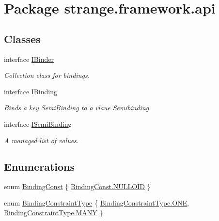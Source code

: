 \hypertarget{namespacestrange_1_1framework_1_1api}{\section{Package strange.\-framework.\-api}
\label{namespacestrange_1_1framework_1_1api}
}
\subsection*{Classes}
\begin{DoxyCompactItemize}
\item 
interface \hyperlink{interfacestrange_1_1framework_1_1api_1_1_i_binder}{I\-Binder}
\begin{DoxyCompactList}\small\item\em Collection class for bindings. \end{DoxyCompactList}\item 
interface \hyperlink{interfacestrange_1_1framework_1_1api_1_1_i_binding}{I\-Binding}
\begin{DoxyCompactList}\small\item\em Binds a key Semi\-Binding to a vlaue Semibinding. \end{DoxyCompactList}\item 
interface \hyperlink{interfacestrange_1_1framework_1_1api_1_1_i_semi_binding}{I\-Semi\-Binding}
\begin{DoxyCompactList}\small\item\em A managed list of values. \end{DoxyCompactList}\end{DoxyCompactItemize}
\subsection*{Enumerations}
\begin{DoxyCompactItemize}
\item 
enum \hyperlink{namespacestrange_1_1framework_1_1api_adcc058ca6ff0fe013ffdbf63ada74a97}{Binding\-Const} \{ \hyperlink{namespacestrange_1_1framework_1_1api_adcc058ca6ff0fe013ffdbf63ada74a97a5f32587ea07e2a7ad41b7461e159da30}{Binding\-Const.\-N\-U\-L\-L\-O\-I\-D}
 \}
\item 
enum \hyperlink{namespacestrange_1_1framework_1_1api_a9819c5ab6d03a2cbce2d3dddf5264e42}{Binding\-Constraint\-Type} \{ \hyperlink{namespacestrange_1_1framework_1_1api_a9819c5ab6d03a2cbce2d3dddf5264e42abc21e6484530fc9d0313cb816b733396}{Binding\-Constraint\-Type.\-O\-N\-E}, 
\hyperlink{namespacestrange_1_1framework_1_1api_a9819c5ab6d03a2cbce2d3dddf5264e42a914afc10e7ea496e240a80be1bc01d09}{Binding\-Constraint\-Type.\-M\-A\-N\-Y}
 \}
\end{DoxyCompactItemize}


